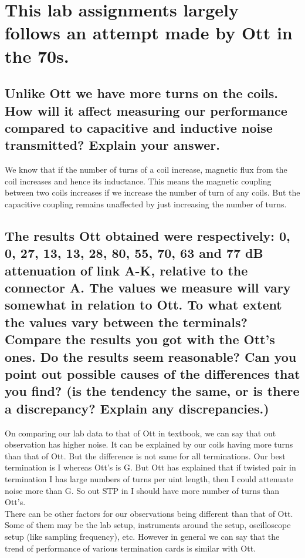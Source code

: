 \documentclass[12pt,a4paper,UKenglish]{article}
\begin{document}
\section{This lab assignments largely follows an attempt made by Ott in the 70s.}
\subsection{Unlike Ott we have more turns on the coils. How will it affect measuring our performance compared to capacitive and inductive noise transmitted? Explain your answer.}
We know that if the number of turns of a coil increase, magnetic flux from the coil increases and hence its inductance. This means the magnetic coupling between two coils increases if we increase the number of turn of any coils. But the capacitive coupling remains unaffected by just increasing the number of turns.
\subsection{ The results Ott obtained were respectively: 0, 0, 27, 13, 13, 28, 80, 55, 70, 63 and 77 dB attenuation of link A-K, relative to the connector A. The values we measure will vary somewhat in relation to Ott. To what extent the values vary between the terminals? Compare the results you got with the Ott's ones. Do the results seem reasonable? Can you point out possible causes of the differences that you find? (is the tendency the same, or is there a discrepancy? Explain any discrepancies.)}
On comparing our lab data to that of Ott in textbook, we can say that out observation has higher noise. It can be explained by our coils having more turns than that of Ott. But the difference is not same for all terminations. Our best termination is I whereas Ott's is G. But Ott has explained that if twisted pair in termination I has large numbers of turns per uint length, then I could attenuate noise more than G. So out STP in I should have more number of turns than Ott's. \\
There can be other factors for our observations being different than that of Ott. Some of them may be the lab setup, instruments around the setup, oscilloscope setup (like sampling frequency), etc. However in general we can say that the trend of performance of various termination cards is similar with Ott.

\end{document}

